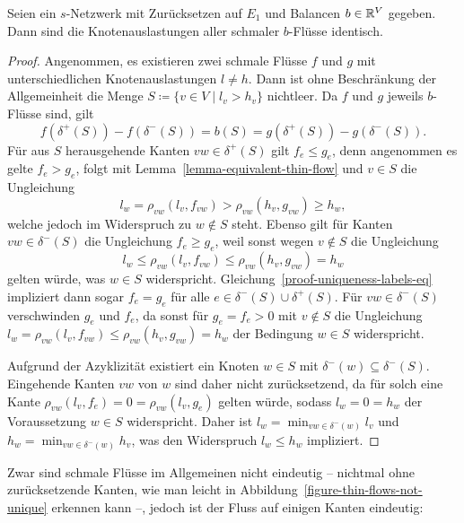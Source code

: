 \begin{lemma}\label{lemma-node-congestion-unique}
	Seien ein $s$-Netzwerk mit Zurücksetzen auf $E_1$ und Balancen $b\in\mathbb{R}^V$ gegeben.
	Dann sind die Knotenauslastungen aller schmaler $b$-Flüsse identisch.
\end{lemma}
\begin{proof}
	Angenommen, es existieren zwei schmale Flüsse $f$ und $g$ mit unterschiedlichen Knotenauslastungen $l\neq h$.
	Dann ist ohne Beschränkung der Allgemeinheit die Menge $S\coloneq \{ v\in V \mid l_v > h_v \}$ nichtleer.
	Da $f$ und $g$ jeweils $b$-Flüsse sind, gilt 
	\begin{equation}\label{proof-uniqueness-labels-eq}
	f( \delta^+(S)) - f(\delta^-(S)) = b(S) = g(\delta^+(S)) - g(\delta^-(S)).
	\end{equation}
	Für aus $S$ herausgehende Kanten $vw\in \delta^+(S)$ gilt $f_e \leq g_e$, denn angenommen es gelte $f_e > g_e$, folgt mit Lemma~\ref{lemma-equivalent-thin-flow} und $v\in S$ die Ungleichung 
	\[l_w = \rho_{vw}(l_v, f_{vw}) > \rho_{vw}(h_v, g_{vw})\geq h_w,\]
	welche jedoch im Widerspruch zu $w\notin S$ steht.
	Ebenso gilt für Kanten $vw\in\delta^-(S)$ die Ungleichung $f_e \geq g_e$, weil sonst wegen $v\notin S$ die Ungleichung
	\[l_w \leq \rho_{vw}(l_v, f_{vw}) \leq \rho_{vw}(h_v, g_{vw}) = h_w\]
	gelten würde, was $w\in S$ widerspricht.
	Gleichung~\ref{proof-uniqueness-labels-eq} impliziert dann sogar $f_e = g_e$ für alle $e\in \delta^-(S) \cup \delta^+(S)$.
	Für $vw\in \delta^-(S)$ verschwinden $g_e$ und $f_e$, da sonst für $g_e=f_e>0$ mit $v\notin S$ die Ungleichung $l_w = \rho_{vw}(l_v, f_{vw})\leq \rho_{vw}(h_v, g_{vw})=h_w$ der Bedingung $w\in S$ widerspricht.
	
	Aufgrund der Azyklizität existiert ein Knoten $w\in S$ mit $\delta^-(w)\subseteq \delta^-(S)$.
	Eingehende Kanten $vw$ von $w$ sind daher nicht zurücksetzend, da für solch eine Kante $\rho_{vw}(l_v, f_e) = 0 = \rho_{vw}(l_v, g_e)$ gelten würde, sodass $l_w = 0 = h_w$ der Voraussetzung $w\in S$ widerspricht.
	Daher ist $l_w = \min_{vw\in \delta^-(w)} l_v$ und $h_w = \min_{vw\in\delta^-(w)} h_v$, was den Widerspruch $l_w \leq h_w$ impliziert.
\end{proof}

Zwar sind schmale Flüsse im Allgemeinen nicht eindeutig -- nichtmal ohne zurück\-setzende Kanten, wie man leicht in Abbildung~\ref{figure-thin-flows-not-unique} erkennen kann --, jedoch ist der Fluss auf einigen Kanten eindeutig:

